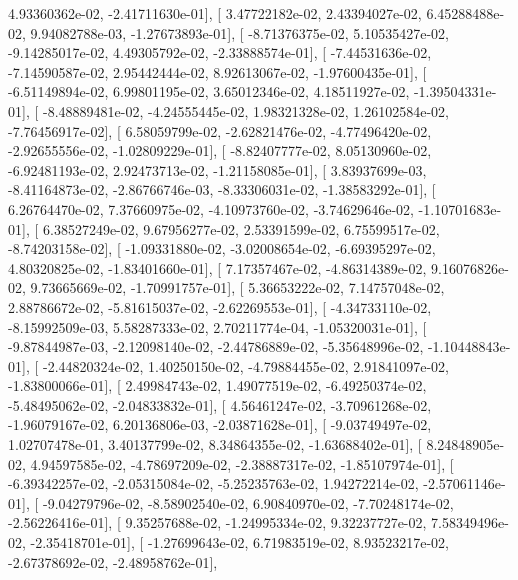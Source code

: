 \documentclass{article}
\begin{document}
          4.93360362e-02,  -2.41711630e-01],
       [  3.47722182e-02,   2.43394027e-02,   6.45288488e-02,
          9.94082788e-03,  -1.27673893e-01],
       [ -8.71376375e-02,   5.10535427e-02,  -9.14285017e-02,
          4.49305792e-02,  -2.33888574e-01],
       [ -7.44531636e-02,  -7.14590587e-02,   2.95442444e-02,
          8.92613067e-02,  -1.97600435e-01],
       [ -6.51149894e-02,   6.99801195e-02,   3.65012346e-02,
          4.18511927e-02,  -1.39504331e-01],
       [ -8.48889481e-02,  -4.24555445e-02,   1.98321328e-02,
          1.26102584e-02,  -7.76456917e-02],
       [  6.58059799e-02,  -2.62821476e-02,  -4.77496420e-02,
         -2.92655556e-02,  -1.02809229e-01],
       [ -8.82407777e-02,   8.05130960e-02,  -6.92481193e-02,
          2.92473713e-02,  -1.21158085e-01],
       [  3.83937699e-03,  -8.41164873e-02,  -2.86766746e-03,
         -8.33306031e-02,  -1.38583292e-01],
       [  6.26764470e-02,   7.37660975e-02,  -4.10973760e-02,
         -3.74629646e-02,  -1.10701683e-01],
       [  6.38527249e-02,   9.67956277e-02,   2.53391599e-02,
          6.75599517e-02,  -8.74203158e-02],
       [ -1.09331880e-02,  -3.02008654e-02,  -6.69395297e-02,
          4.80320825e-02,  -1.83401660e-01],
       [  7.17357467e-02,  -4.86314389e-02,   9.16076826e-02,
          9.73665669e-02,  -1.70991757e-01],
       [  5.36653222e-02,   7.14757048e-02,   2.88786672e-02,
         -5.81615037e-02,  -2.62269553e-01],
       [ -4.34733110e-02,  -8.15992509e-03,   5.58287333e-02,
          2.70211774e-04,  -1.05320031e-01],
       [ -9.87844987e-03,  -2.12098140e-02,  -2.44786889e-02,
         -5.35648996e-02,  -1.10448843e-01],
       [ -2.44820324e-02,   1.40250150e-02,  -4.79884455e-02,
          2.91841097e-02,  -1.83800066e-01],
       [  2.49984743e-02,   1.49077519e-02,  -6.49250374e-02,
         -5.48495062e-02,  -2.04833832e-01],
       [  4.56461247e-02,  -3.70961268e-02,  -1.96079167e-02,
          6.20136806e-03,  -2.03871628e-01],
       [ -9.03749497e-02,   1.02707478e-01,   3.40137799e-02,
          8.34864355e-02,  -1.63688402e-01],
       [  8.24848905e-02,   4.94597585e-02,  -4.78697209e-02,
         -2.38887317e-02,  -1.85107974e-01],
       [ -6.39342257e-02,  -2.05315084e-02,  -5.25235763e-02,
          1.94272214e-02,  -2.57061146e-01],
       [ -9.04279796e-02,  -8.58902540e-02,   6.90840970e-02,
         -7.70248174e-02,  -2.56226416e-01],
       [  9.35257688e-02,  -1.24995334e-02,   9.32237727e-02,
          7.58349496e-02,  -2.35418701e-01],
       [ -1.27699643e-02,   6.71983519e-02,   8.93523217e-02,
         -2.67378692e-02,  -2.48958762e-01],
\end{document}

